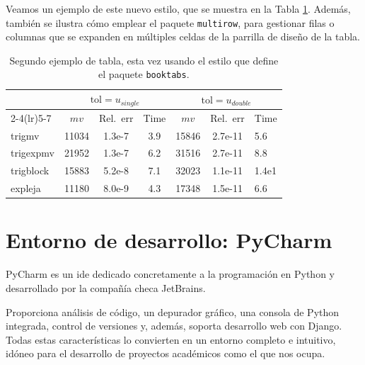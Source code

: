 Veamos un ejemplo de este nuevo estilo, que se muestra en la Tabla \ref{tbl:ejemplo-booktabs}. Además, también
se ilustra cómo emplear el paquete \texttt{multirow}, para gestionar filas o columnas que se expanden en múltiples
celdas de la parrilla de diseño de la tabla.


\begin{table}[hb]
    \centering
    \caption{Segundo ejemplo de tabla, esta vez usando el estilo que define el paquete \texttt{booktabs}.}
    \label{tbl:ejemplo-booktabs}
    \begin{tabular}{@{}lcccccl@{}}\toprule
        & \multicolumn{3}{c}{$\mathrm{tol}=u_{single}$} & \multicolumn{3}{c}{$\mathrm{tol}=u_{double}$}
        \\\cmidrule(lr){2-4}\cmidrule(lr){5-7}
        & $mv$  & Rel.~err & Time    & $mv$  & Rel.~err & Time\\
        \midrule
        trigmv    & 11034 & 1.3e-7 & 3.9 & 15846 & 2.7e-11 & 5.6 \\
        trigexpmv & 21952 & 1.3e-7 & 6.2 & 31516 & 2.7e-11 & 8.8 \\
        trigblock & 15883 & 5.2e-8 & 7.1 & 32023 & 1.1e-11 & 1.4e1\\
        expleja   & 11180 & 8.0e-9 & 4.3 & 17348 & 1.5e-11 & 6.6 \\
        \bottomrule
    \end{tabular}
\end{table}

\section{Entorno de desarrollo: PyCharm}
\label{sec:entorno_de_desarrollo}


PyCharm es un \gls{ide} dedicado concretamente a la programación en Python y desarrollado por la compañía checa JetBrains.

Proporciona análisis de código, un depurador gráfico, una consola de Python integrada, control de versiones y, además, soporta desarrollo web con Django. Todas estas características lo convierten en un entorno completo e intuitivo, idóneo para el desarrollo de proyectos académicos como el que nos ocupa.


